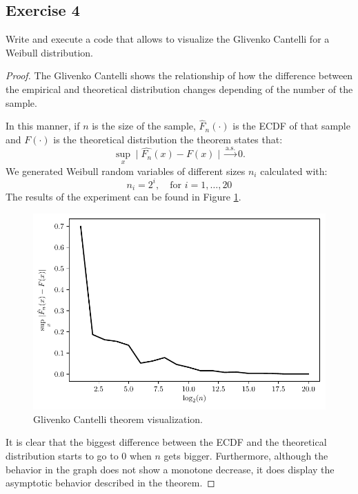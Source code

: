 \documentclass[11pt]{article}
\theoremstyle{definition}
\theoremstyle{remark}
\theoremstyle{remark}
\begin{document}
\subsection*{Exercise 4}
Write and execute a code that allows to visualize the Glivenko
Cantelli for a Weibull distribution.
\begin{proof}
  The Glivenko Cantelli shows the relationship of how the difference
  between the empirical and theoretical distribution changes depending
  of the number of the sample.

  In this manner, if $n$ is the size of the sample, $\hat{F}_n(\cdot)$ is
  the ECDF of that sample and $F(\cdot)$ is the theoretical distribution
  the theorem states that:
  \begin{equation*}
    \sup_x \mid \hat{F_n}(x) - F(x) \mid \xrightarrow[]{\text{a.s.}} 0.
  \end{equation*}
  We generated Weibull random variables of different
  sizes $n_i$ calculated with:
  \begin{equation*}
    n_i = 2^i, \quad \text{for } i=1,\ldots,20
  \end{equation*}
  The results of the experiment can be found in Figure \ref{fig:ex4}.
  \begin{figure}[H]
    \centering
    \includegraphics[scale=0.5]{../figs/weibull.pdf}
    \caption{Glivenko Cantelli theorem visualization.}
    \label{fig:ex4}
  \end{figure}

  It is clear that the biggest difference between the ECDF and the
  theoretical distribution starts to go to 0 when $n$ gets
  bigger. Furthermore, although the behavior in the graph does not
  show a monotone decrease, it does display the asymptotic behavior
  described in the theorem.
\end{proof}
\end{document}
